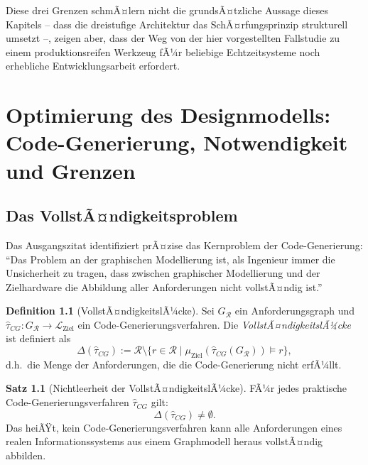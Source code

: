 ﻿\documentclass[a4paper,12pt]{report}
\theoremstyle{definition}
\newtheorem{definition}{Definition}[section]
\newtheorem{satz}{Satz}[section]
\begin{document}
\noindent
Diese drei Grenzen schmÃ¤lern nicht die grundsÃ¤tzliche Aussage dieses
Kapitels -- dass die dreistufige Architektur das SchÃ¤rfungsprinzip
strukturell umsetzt --, zeigen aber, dass der Weg von der hier vorgestellten
Fallstudie zu einem produktionsreifen Werkzeug fÃ¼r beliebige
Echtzeitsysteme noch erhebliche Entwicklungsarbeit erfordert.

\chapter{Optimierung des Designmodells: Code-Generierung, Notwendigkeit und Grenzen}

\label{sec:codegen}

\section{Das VollstÃ¤ndigkeitsproblem}

Das Ausgangszitat identifiziert prÃ¤zise das Kernproblem der Code-Generierung:
\enquote{Das Problem an der graphischen Modellierung ist, als Ingenieur immer die Unsicherheit
zu tragen, dass zwischen graphischer Modellierung und der Zielhardware die Abbildung aller
Anforderungen nicht vollstÃ¤ndig ist.}

\begin{definition}[VollstÃ¤ndigkeitslÃ¼cke]
\label{def:vollstaendigkeit}
Sei $G_\mathcal{R}$ ein Anforderungsgraph und $\hat{\tau}_{CG}: G_\mathcal{R} \to \mathcal{L}_{\text{Ziel}}$
ein Code-Generierungsverfahren. Die \emph{VollstÃ¤ndigkeitslÃ¼cke} ist definiert als
\[
  \Delta(\hat{\tau}_{CG}) := \mathcal{R} \setminus \{r \in \mathcal{R} \mid
  \mu_{\text{Ziel}}(\hat{\tau}_{CG}(G_\mathcal{R})) \models r\},
\]
d.h.\ die Menge der Anforderungen, die die Code-Generierung nicht erfÃ¼llt.
\end{definition}

\begin{satz}[Nichtleerheit der VollstÃ¤ndigkeitslÃ¼cke]
\label{satz:luecke}
FÃ¼r jedes praktische Code-Generierungsverfahren $\hat{\tau}_{CG}$ gilt:
\[
  \Delta(\hat{\tau}_{CG}) \neq \emptyset.
\]
Das heiÃŸt, kein Code-Generierungsverfahren kann alle Anforderungen eines realen
Informationssystems aus einem Graphmodell heraus vollstÃ¤ndig abbilden.
\end{satz}
\end{document}
